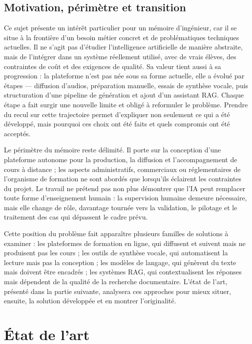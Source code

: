 \documentclass[12pt,a4paper]{article}
\begin{document}
\subsection{Motivation, périmètre et transition}

Ce sujet présente un intérêt particulier pour un mémoire d'ingénieur, car il se situe à la
frontière d'un besoin métier concret et de problématiques techniques actuelles. Il ne s'agit
pas d'étudier l'intelligence artificielle de manière abstraite, mais de l'intégrer dans un
système réellement utilisé, avec de vrais élèves, des contraintes de coût et des exigences de
qualité. Sa valeur tient aussi à sa progression : la plateforme n'est pas née sous sa forme
actuelle, elle a évolué par étapes — diffusion d'audios, préparation manuelle, essais de
synthèse vocale, puis structuration d'une pipeline de génération et ajout d'un assistant
RAG. Chaque étape a fait surgir une nouvelle limite et obligé à reformuler le problème.
Prendre du recul sur cette trajectoire permet d'expliquer non seulement ce qui a été
développé, mais pourquoi ces choix ont été faits et quels compromis ont été acceptés.

Le périmètre du mémoire reste délimité. Il porte sur la conception d'une plateforme
autonome pour la production, la diffusion et l'accompagnement de cours à distance ; les
aspects administratifs, commerciaux ou réglementaires de l'organisme de formation ne sont
abordés que lorsqu'ils éclairent les contraintes du projet. Le travail ne prétend pas non
plus démontrer que l'IA peut remplacer toute forme d'enseignement humain : la
supervision humaine demeure nécessaire, mais elle change de rôle, davantage tournée vers
la validation, le pilotage et le traitement des cas qui dépassent le cadre prévu.

Cette position du problème fait apparaître plusieurs familles de solutions à examiner :
les plateformes de formation en ligne, qui diffusent et suivent mais ne produisent pas les
cours ; les outils de synthèse vocale, qui automatisent la lecture mais pas la conception ;
les modèles de langage, qui génèrent du texte mais doivent être encadrés ; les systèmes
RAG, qui contextualisent les réponses mais dépendent de la qualité de la recherche
documentaire. L'état de l'art, présenté dans la partie suivante, analysera ces approches
pour mieux situer, ensuite, la solution développée et en montrer l'originalité.

\clearpage
\section{État de l'art}
\end{document}
